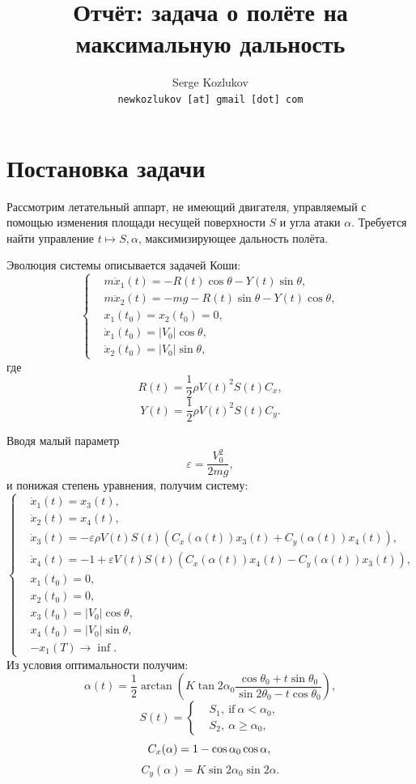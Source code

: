 \documentclass{article}
\title{Отчёт: задача о полёте на максимальную дальность}
\author{Serge Kozlukov\\ \texttt{newkozlukov [at] gmail [dot] com}}
\begin{document}
\maketitle
\tableofcontents

\section{Постановка задачи}
Рассмотрим летательный аппарт, не имеющий двигателя, управляемый с помощью
изменения площади несущей поверхности \( S \) и угла атаки \( \alpha \).
Требуется найти управление \(t\mapsto S, \alpha\), максимизирующее дальность полёта.

Эволюция системы описывается задачей Коши:
\begin{equation}
  \left\{
    \begin{aligned}
      & m\ddot x_1(t) = - R(t)\cos\theta - Y(t)\sin\theta,\\
      & m\ddot x_2(t) = - mg - R(t)\sin\theta - Y(t)\cos\theta,\\
      & x_1(t_0) = x_2(t_0) = 0,\\
      & \dot x_1(t_0) = |V_0|\cos\theta,\\
      & \dot x_2(t_0) = |V_0|\sin\theta,
      \end{aligned}
  \right.
\end{equation}
где
\[ R(t) = \frac12 \rho V(t)^2 S(t) C_x,\]
\[ Y(t) = \frac12 \rho V(t)^2 S(t) C_y.\]

Вводя малый параметр
\[ \varepsilon = \frac{V_0^2}{2mg}, \]
и понижая степень уравнения, получим систему:
\begin{equation}
  \left\{
    \begin{aligned}
      & \dot x_1(t) = x_3(t),\\
      & \dot x_2(t) = x_4(t),\\
      & \dot x_3(t) = -\varepsilon\rho V(t)S(t) (C_x(\alpha(t)) x_3(t) + C_y(\alpha(t)) x_4(t)),\\
      & \dot x_4(t) = -1 + \varepsilon V(t)S(t) (C_x(\alpha(t)) x_4(t) - C_y(\alpha(t)) x_3(t)),\\
      & x_1(t_0) = 0,\\
      & x_2(t_0) = 0,\\
      & x_3(t_0) = |V_0|\cos\theta,\\
      & x_4(t_0) = |V_0|\sin\theta,\\
      & -x_1(T) \to\inf.
    \end{aligned}
  \right.
\end{equation}
Из условия оптимальности получим:
\[
  \alpha(t) = \frac12 \arctan(K\tan2\alpha_0\frac{\cos\theta_0 +
    t\sin\theta_0}{\sin2\theta_0 - t\cos\theta_0}),
\]
\[
  S(t) = \left\{ \begin{aligned}
      & S_1,\ \text{if}\ \alpha < \alpha_0,\\
      & S_2,\ \alpha\geq\alpha_0,
    \end{aligned} \right.
\]
\[
  C_x(\alpha) = 1 - \cos\alpha_0\cos\alpha,\\
\]
\[
  C_y(\alpha) = K\sin2\alpha_0\sin2\alpha.
\]
\end{document}
